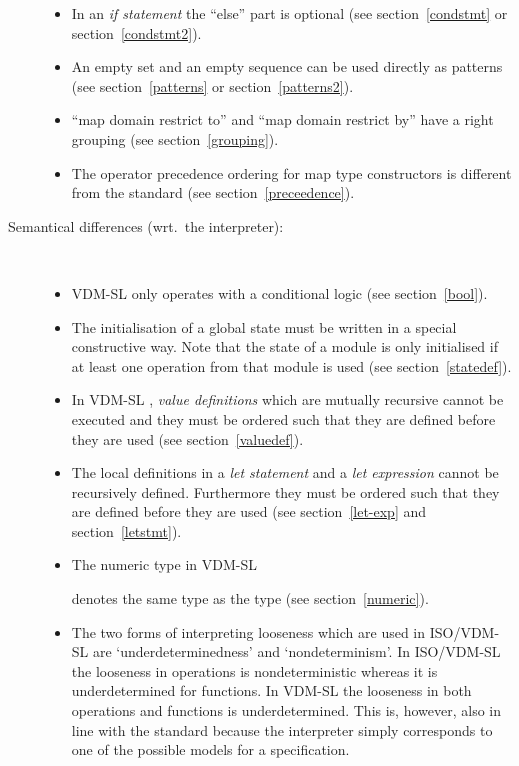 \documentclass[\pformat,12pt]{article}
\newcommand{\vdmslpp}[2]{%
#1
}
\newcommand{\vdmsl}{VDM-SL}
\newcommand{\vdmpp}{VDM++}
\begin{document}
\begin{description}
\begin{itemize}
  \item In an {\it if statement\/} the ``else'' part is optional (see
        section~\ref{condstmt} or section~\ref{condstmt2}).
        
  \item An empty set and an empty sequence can be used directly as
        patterns (see section~\ref{patterns} or section~\ref{patterns2}).
  \item ``map domain restrict to'' and ``map domain restrict by'' have
        a right grouping (see section~\ref{grouping}).
  \item The operator precedence ordering for map type constructors is
        different from the standard (see section~\ref{preceedence}).


  \end{itemize}
  
\item[Semantical differences (wrt.\ the interpreter):]\mbox{}\\[-3mm] 
  \begin{itemize}
  
  \item  \vdmslpp{\vdmsl}{\vdmpp} only operates with a
    conditional logic (see section~\ref{bool}).
    
  \item The initialisation of a global state must be written in a
    special constructive way. Note that the state of a module is only
    initialised if at least one operation from that module is used
    (see section~\ref{statedef}).

  \item In  \vdmslpp{\vdmsl}{\vdmpp}, {\it value definitions\/}
    which are mutually recursive cannot be executed and they must be
    ordered such that they are defined before they are used (see
    section~\ref{valuedef}).
    
  \item The local definitions in a {\it let statement\/} and a {\it
    let expression\/} cannot be recursively defined. Furthermore they
    must be ordered such that they are defined before they are used
    (see section~\ref{let-exp} and section~\ref{letstmt}).
    
  \item The numeric type  in  \vdmslpp{\vdmsl}{\vdmpp}
    denotes the same type as the type  (see
    section~\ref{numeric}).
      
  \item The two forms of interpreting looseness which are used in
    ISO/VDM-SL are `underdeterminedness' and `nondeterminism'. In
    ISO/VDM-SL the looseness in operations is nondeterministic whereas
    it is underdetermined for functions. In 
    \vdmslpp{\vdmsl}{\vdmpp} the looseness in both operations and
    functions is underdetermined. This is, however, also in line with
    the standard because the interpreter simply corresponds to one of
    the possible models for a specification.

  \end{itemize}
\end{description}
\end{document}
